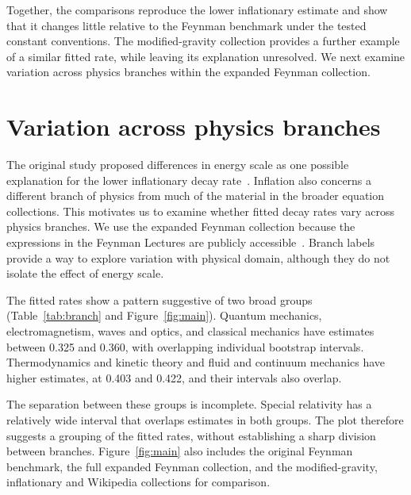 \documentclass[10pt]{article}
\begin{document}
Together, the comparisons reproduce the lower inflationary estimate and show that it changes little relative to the Feynman benchmark under the tested constant conventions. The modified-gravity collection provides a further example of a similar fitted rate, while leaving its explanation unresolved. We next examine variation across physics branches within the expanded Feynman collection.

\section{Variation across physics branches}\label{sec:results}

The original study proposed differences in energy scale as one possible explanation for the lower inflationary decay rate~\citep{constantin2024}. Inflation also concerns a different branch of physics from much of the material in the broader equation collections. This motivates us to examine whether fitted decay rates vary across physics branches. We use the expanded Feynman collection because the expressions in the Feynman Lectures are publicly accessible~\citep{feynman}. Branch labels provide a way to explore variation with physical domain, although they do not isolate the effect of energy scale.

The fitted rates show a pattern suggestive of two broad groups (Table~\ref{tab:branch} and Figure~\ref{fig:main}). Quantum mechanics, electromagnetism, waves and optics, and classical mechanics have estimates between 0.325 and 0.360, with overlapping individual bootstrap intervals. Thermodynamics and kinetic theory and fluid and continuum mechanics have higher estimates, at 0.403 and 0.422, and their intervals also overlap.

The separation between these groups is incomplete. Special relativity has a relatively wide interval that overlaps estimates in both groups. The plot therefore suggests a grouping of the fitted rates, without establishing a sharp division between branches. Figure~\ref{fig:main} also includes the original Feynman benchmark, the full expanded Feynman collection, and the modified-gravity, inflationary and Wikipedia collections for comparison.
\end{document}
